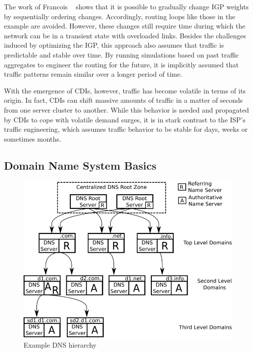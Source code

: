 The work of Francois \etal~\cite{transient-IGP} shows that it is possible to
gradually change IGP weights by sequentially ordering changes. Accordingly,
routing loops like those in the example are avoided. However, these changes
still require time during which the network can be in a transient state with
overloaded links. Besides the challenges induced by optimizing the IGP, this
approach also assumes that traffic is predictable and stable over time. By
running simulations based on past traffic aggregates to engineer the routing
for the future, it is implicitly assumed that traffic patterns remain similar
over a longer period of time.

With the emergence of CDIs, however, traffic has become volatile in terms of
its origin. In fact, CDIs can shift massive amounts of traffic in a matter of
seconds from one server cluster to another. While this behavior is needed and
propagated by CDIs to cope with volatile demand surges, it is in stark contrast
to the ISP's traffic engineering, which assumes traffic behavior to be stable
for days, weeks or sometimes months.


\subsection{Domain Name System Basics}\label{sec:DNS}

\begin{figure}[tbp] \begin{center}
\includegraphics[width=0.8\linewidth]{figures-pdf/DNSHierarchy} 
\end{center}
\caption{Example DNS hierarchy} 
\label{fig:DNS-Hierarchy} 
\end{figure}

